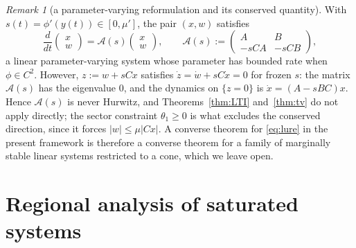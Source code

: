 \documentclass[preprint,12pt,authoryear]{elsarticle}
\theoremstyle{definition}
\theoremstyle{remark}
\newtheorem{remark}[theorem]{Remark}
\begin{document}
\begin{remark}[a parameter-varying reformulation and its conserved quantity]\label{rem:lpv}
With $s(t)=\phi'(y(t))\in[0,\mu']$, the pair $(x,w)$ satisfies
\begin{equation}\label{eq:lureLPV}
\frac{d}{dt}\begin{pmatrix}x\\w\end{pmatrix}=\mathcal A(s)\begin{pmatrix}x\\w\end{pmatrix},\qquad\mathcal A(s):=\begin{pmatrix}A&B\\-sCA&-sCB\end{pmatrix},
\end{equation}
a linear parameter-varying system whose parameter has bounded rate when $\phi\in C^2$. However, $z:=w+sCx$ satisfies $\dot z=\dot w+sC\dot x=0$ for frozen $s$: the matrix $\mathcal A(s)$ has the eigenvalue $0$, and the dynamics on $\{z=0\}$ is $\dot x=(A-sBC)x$. Hence $\mathcal A(s)$ is never Hurwitz, and Theorems~\ref{thm:LTI} and~\ref{thm:tv} do not apply directly; the sector constraint $\theta_1\ge0$ is what excludes the conserved direction, since it forces $|w|\le\mu|Cx|$. A converse theorem for \eqref{eq:lure} in the present framework is therefore a converse theorem for a family of marginally stable linear systems restricted to a cone, which we leave open.
\end{remark}

\section{Regional analysis of saturated systems}\label{sec:regional}
\end{document}
